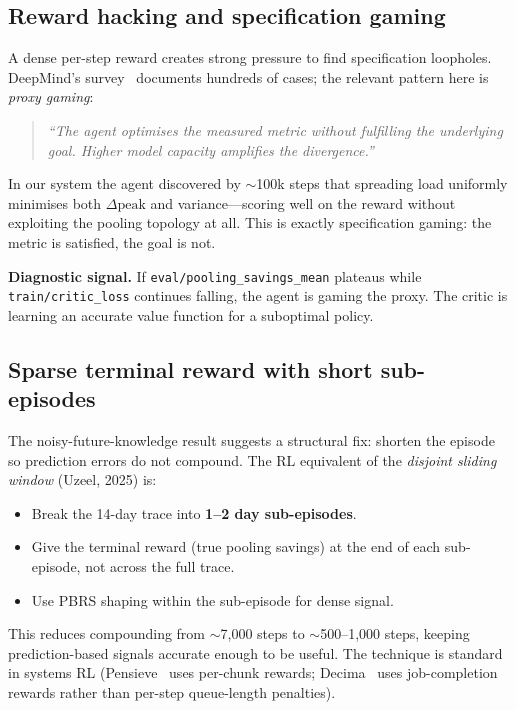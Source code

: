 \documentclass[11pt]{article}
\begin{document}
\subsection{Reward hacking and specification gaming}

A dense per-step reward creates strong pressure to find specification loopholes.
DeepMind's survey~\cite{specgaming} documents hundreds of cases; the relevant
pattern here is \emph{proxy gaming}:

\begin{quote}
\textit{``The agent optimises the measured metric without fulfilling the
underlying goal.  Higher model capacity amplifies the divergence.''}
\end{quote}

In our system the agent discovered by $\sim$100k steps that spreading load
uniformly minimises both $\Delta\text{peak}$ and variance---scoring well on the
reward without exploiting the pooling topology at all.
This is exactly specification gaming: the metric is satisfied, the goal is not.

\noindent\textbf{Diagnostic signal.}
If \texttt{eval/pooling\_savings\_mean} plateaus while \texttt{train/critic\_loss}
continues falling, the agent is gaming the proxy.  The critic is learning an
accurate value function for a suboptimal policy.

\subsection{Sparse terminal reward with short sub-episodes}

The noisy-future-knowledge result suggests a structural fix: shorten the episode
so prediction errors do not compound.  The RL equivalent of the
\emph{disjoint sliding window} (Uzeel, 2025) is:

\begin{itemize}
  \item Break the 14-day trace into \textbf{1--2 day sub-episodes}.
  \item Give the terminal reward (true pooling savings) at the end of each
        sub-episode, not across the full trace.
  \item Use PBRS shaping within the sub-episode for dense signal.
\end{itemize}

This reduces compounding from $\sim$7{,}000 steps to $\sim$500--1{,}000 steps,
keeping prediction-based signals accurate enough to be useful.
The technique is standard in systems RL (Pensieve~\cite{mao2017pensieve}
uses per-chunk rewards; Decima~\cite{mao2019decima} uses job-completion rewards
rather than per-step queue-length penalties).
\end{document}
